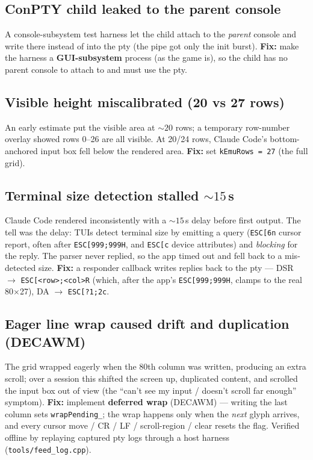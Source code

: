 \documentclass[11pt]{article}
\newcommand{\ic}[1]{\texttt{#1}}
\begin{document}
\subsection{ConPTY child leaked to the parent console}
A console-subsystem test harness let the child attach to the \emph{parent} console and
write there instead of into the pty (the pipe got only the init burst).
\textbf{Fix:} make the harness a \textbf{GUI-subsystem} process (as the game is), so the
child has no parent console to attach to and must use the pty.

\subsection{Visible height miscalibrated (20 vs 27 rows)}
An early estimate put the visible area at ${\sim}20$ rows; a temporary row-number overlay
showed rows 0--26 are all visible. At 20/24 rows, Claude Code's bottom-anchored input box
fell below the rendered area. \textbf{Fix:} set \ic{kEmuRows = 27} (the full grid).

\subsection{Terminal size detection stalled ${\sim}15$\,s}
\label{sec:dsr}
Claude Code rendered inconsistently with a ${\sim}15$\,s delay before first output. The
tell was the delay: TUIs detect terminal size by emitting a query (\ic{ESC[6n} cursor
report, often after \ic{ESC[999;999H}, and \ic{ESC[c} device attributes) and
\emph{blocking} for the reply. The parser never replied, so the app timed out and
fell back to a mis-detected size. \textbf{Fix:} a responder callback writes replies back
to the pty --- DSR $\rightarrow$ \ic{ESC[<row>;<col>R} (which, after the app's
\ic{ESC[999;999H}, clamps to the real 80$\times$27), DA $\rightarrow$ \ic{ESC[?1;2c}.

\subsection{Eager line wrap caused drift and duplication (DECAWM)}
\label{sec:decawm}
The grid wrapped eagerly when the 80th column was written, producing an extra scroll;
over a session this shifted the screen up, duplicated content, and scrolled the input
box out of view (the ``can't see my input / doesn't scroll far enough'' symptom).
\textbf{Fix:} implement \textbf{deferred wrap} (DECAWM) --- writing the last column sets
\ic{wrapPending_}; the wrap happens only when the \emph{next} glyph arrives, and every
cursor move / CR / LF / scroll-region / clear resets the flag. Verified offline by
replaying captured pty logs through a host harness (\texttt{tools/feed_log.cpp}).
\end{document}
